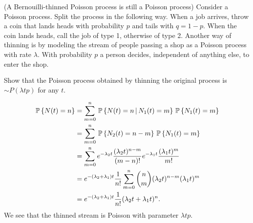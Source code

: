 \begin{question} (A Bernouilli-thinned Poisson process is still a
  Poisson process) Consider a Poisson process. Split the process in
  the following way. When a job arrives, throw a coin that lands heads
  with probability $p$ and tails with $q=1-p$. When the coin lands
  heads, call the job of type 1, otherwise of type 2.  Another way of
  thinning is by modeling the stream of people passing a shop as a
  Poisson process with rate $\lambda$. With probability $p$ a person
  decides, independent of anything else, to enter the shop.

  Show that the Poisson process obtained by thinning the original
  process is $\sim P(\lambda t p)$ for any $t$.
 

    \begin{solution}
\begin{equation*}
  \begin{split}
    \,\mathbb{P}\left\{N(t) = n\right\}
&= \sum_{m=0}^n \,\mathbb{P}\left\{N(t) =n \,\middle|\, N_1(t) = m\right\}\,\mathbb{P}\left\{N_1(t) = m\right\} \\
&= \sum_{m=0}^n \,\mathbb{P}\left\{N_2(t) =n-m\right\}\,\mathbb{P}\left\{N_1(t) = m\right\} \\
&= \sum_{m=0}^n 
e^{-\lambda_2 t}\frac{(\lambda_2 t)^{n-m}}{(m-n)!} 
e^{-\lambda_1 t}\frac{(\lambda_1 t)^{m}}{m!} \\
&= e^{-(\lambda_2+\lambda_1) t} \frac{1}{n!}\sum_{m=0}^n 
{n \choose m} (\lambda_2 t)^{n-m} (\lambda_1 t)^{m}\\
&= e^{-(\lambda_2+\lambda_1) t} \frac{1}{n!}(\lambda_2 t + \lambda_1 t)^n.
  \end{split}
\end{equation*}
We see that the thinned stream is Poisson with parameter $\lambda t p$. 
\end{solution}
\end{question}    


